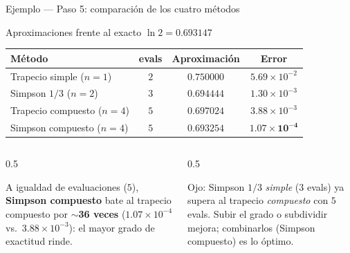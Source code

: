 \documentclass[aspectratio=169,10pt]{beamer}
\begin{document}
\begin{frame}{Ejemplo — Paso 5: comparación de los cuatro métodos}
\vspace{1mm}
\begin{cardgear}{Aproximaciones frente al exacto $\ln 2=0.693147$}{\faTable}
\centering
{\small\renewcommand{\arraystretch}{1.4}\setlength{\tabcolsep}{9pt}
\begin{tabular}{l|c|c|c}
Método & evals & Aproximación & Error\\\hline
Trapecio simple ($n{=}1$) & $2$ & $0.750000$ & $5.69{\times}10^{-2}$\\
Simpson $1/3$ ($n{=}2$) & $3$ & $0.694444$ & $1.30{\times}10^{-3}$\\
Trapecio compuesto ($n{=}4$) & $5$ & $0.697024$ & $3.88{\times}10^{-3}$\\
Simpson compuesto ($n{=}4$) & $5$ & $0.693254$ & $\mathbf{1.07{\times}10^{-4}}$\\
\end{tabular}}
\end{cardgear}
\vspace{2mm}
\begin{columns}[T]
\begin{column}{0.5\textwidth}
\begin{cardnota}[\faInfoCircle]
{\footnotesize A igualdad de evaluaciones ($5$), \textbf{Simpson compuesto} bate al trapecio compuesto por $\sim$\textbf{36 veces} ($1.07{\times}10^{-4}$ vs.\ $3.88{\times}10^{-3}$): el mayor grado de exactitud rinde.}
\end{cardnota}
\end{column}
\begin{column}{0.5\textwidth}
\begin{cardnota}[\faExclamationTriangle]
{\footnotesize Ojo: Simpson $1/3$ \emph{simple} ($3$ evals) ya supera al trapecio \emph{compuesto} con $5$ evals. Subir el grado o subdividir mejora; combinarlos (Simpson compuesto) es lo óptimo.}
\end{cardnota}
\end{column}
\end{columns}
\end{frame}
\end{document}
